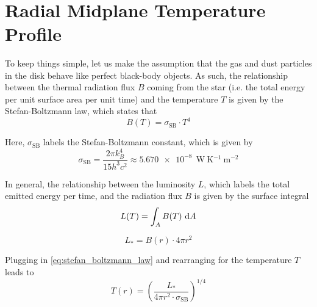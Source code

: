     \ \\ %
    

\section{Radial Midplane Temperature Profile}

    To keep things simple, let us make the assumption that the gas and dust particles 
    in the disk behave like perfect black-body objects. As such, the relationship between the
    thermal radiation flux $B$ coming from the star (i.e. the total energy per unit surface area 
    per unit time) and the temperature $T$ is given by the Stefan-Boltzmann law, which states that
    \begin{equation}
        \label{eq:stefan_boltzmann_law}
        B(T) = \sigma_\text{SB}\cdot T^4   %
    \end{equation}

    Here, $\sigma_\text{SB}$ labels the Stefan-Boltzmann constant, which is given by 
    \begin{equation}
        \sigma_\text{SB}
            = \frac{2\pi k_B^4}{15h^3 c^2}
            \approx \SI{5.670e-8}{\ \watt\ \kelvin^{-1}\ \meter^{-2}}
    \end{equation}

    In general, the relationship between the luminosity $L$, which labels the total emitted energy 
    per time, and the radiation flux $B$ is given by the surface integral
    \begin{equation}
        L(T) = \int_A B(T) \ \text dA
    \end{equation}
    
    \begin{equation}
        L_* = B(r) \cdot 4\pi r^2
    \end{equation}

    Plugging in \cref{eq:stefan_boltzmann_law} and rearranging for the temperature $T$ leads to
    \begin{equation}
        T(r) = \left(
            \frac{L_*}{4\pi r^2 \cdot \sigma_\text{SB}}
        \right)^{1/4}
    \end{equation}

